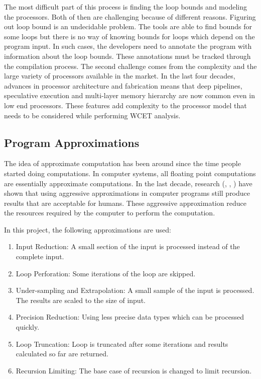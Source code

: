 The most difficult part of this process is finding the loop bounds and  modeling the processors. Both of then are challenging because of different reasons. Figuring out loop bound is an undecidable problem. The tools are able to find bounds for some loops but there is no way of knowing bounds for loops which depend on the program input. In such cases, the developers need to annotate the program with information about the loop bounds. These annotations must be tracked through the compilation process. The second challenge comes from the complexity and the large variety of processors available in the market. In the last four decades, advances in processor architecture and fabrication means that deep pipelines, speculative execution and multi-layer memory hierarchy are now common even in low end processors. These features add complexity to the processor model that needs to be considered while performing WCET analysis. 


\subsection{Program Approximations}
The idea of approximate computation has been around since the time people started doing computations. In computer systems, all floating point computations are essentially approximate computations. In the last decade, research (\cite{Loop}, \cite{Image}, \cite{Canary}) have shown that using aggressive approximations in computer programs still produce results that are acceptable for humans. These aggressive approximation reduce the resources required by the computer to perform the computation. 

In this project, the following approximations are used: 
\begin{enumerate}
\item Input Reduction: A small section of the input is processed instead of the complete input.
\item Loop Perforation: Some iterations of the loop are skipped.
\item Under-sampling and Extrapolation: A small sample of the input is processed. The results are scaled to the size of input.
\item Precision Reduction: Using less precise data types which can be processed quickly.
\item Loop Truncation: Loop is truncated after some iterations and results calculated so far are returned.
\item Recursion Limiting: The base case of recursion is changed to limit recursion.
\end{enumerate}

